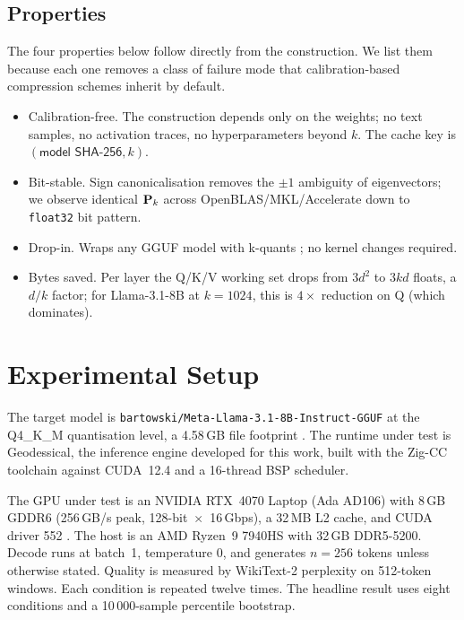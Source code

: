 \documentclass[11pt]{article}
\begin{document}
\subsection{Properties}
The four properties below follow directly from the construction. We list
them because each one removes a class of failure mode that calibration-based
compression schemes inherit by default.

\begin{itemize}
\item Calibration-free. The construction depends only on the
weights; no text samples, no activation traces, no hyperparameters beyond
$k$.  The cache key is $(\textsf{model SHA-256}, k)$.
\item Bit-stable.  Sign canonicalisation removes the
$\pm1$ ambiguity of eigenvectors; we observe identical $\mathbf{P}_k$ across
OpenBLAS/MKL/Accelerate down to \texttt{float32} bit pattern.
\item Drop-in.  Wraps any GGUF \cite{ggerganov2023gguf} model with
k-quants \cite{ggerganov2023kquants}; no kernel changes required.
\item Bytes saved.  Per layer the Q/K/V working set drops from
$3d^2$ to $3kd$ floats, a $d/k$ factor; for Llama-3.1-8B at $k{=}1024$, this
is $4\times$ reduction on Q (which dominates).
\end{itemize}
\FloatBarrier

\section{Experimental Setup}
\label{sec:setup}

The target model is \texttt{bartowski/Meta-Llama-3.1-8B-Instruct-GGUF} at
the Q4\_K\_M quantisation level, a 4.58\,GB file footprint
\cite{grattafiori2024llama3,ggerganov2023kquants}. The runtime under test
is Geodessical, the inference engine developed for this work, built with
the Zig-CC toolchain against CUDA~12.4 and a 16-thread BSP scheduler.

The GPU under test is an NVIDIA RTX~4070 Laptop (Ada AD106) with
8\,GB GDDR6 (256\,GB/s peak, 128-bit~$\times$~16\,Gbps), a 32\,MB L2
cache, and CUDA driver 552 \cite{nvidia2022ada}. The host is an AMD
Ryzen~9 7940HS with 32\,GB DDR5-5200. Decode runs at batch~1, temperature
$0$, and generates $n{=}256$ tokens unless otherwise stated. Quality is
measured by WikiText-2 perplexity \cite{merity2016wikitext} on 512-token
windows. Each condition is repeated twelve times. The headline result
uses eight conditions and a 10\,000-sample percentile bootstrap.
\end{document}
